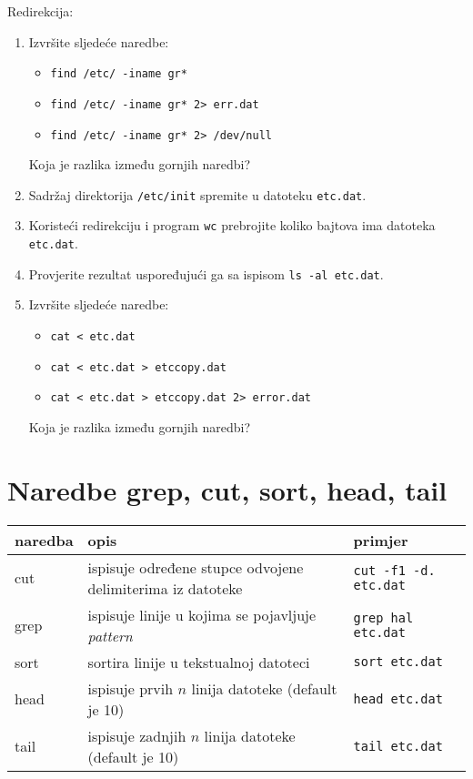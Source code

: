 \begin{zadatak} Redirekcija: 
\begin{enumerate}
\item 
Izvršite sljedeće naredbe:
\begin{itemize}
 \item \lstinline!find /etc/ -iname gr*!
\item \lstinline!find /etc/ -iname gr* 2> err.dat!
\item \lstinline!find /etc/ -iname gr* 2> /dev/null!
\end{itemize}             
Koja je razlika između gornjih naredbi?
\item Sadržaj direktorija \lstinline!/etc/init! spremite u datoteku \lstinline!etc.dat!.
\item Koristeći redirekciju i program \lstinline!wc! prebrojite koliko bajtova ima datoteka \lstinline!etc.dat!.
\item Provjerite rezultat uspoređujući ga sa ispisom \lstinline!ls -al etc.dat!.
\item Izvršite sljedeće naredbe:
\begin{itemize}
 \item \lstinline!cat < etc.dat!
\item \lstinline!cat < etc.dat > etccopy.dat!
\item \lstinline!cat < etc.dat > etccopy.dat 2> error.dat!
\end{itemize}
Koja je razlika između gornjih naredbi?
\end{enumerate}
\end{zadatak}

\section{Naredbe grep, cut, sort, head, tail}

\begin{tabularx}{\textwidth}{lXl} 
\hline 
naredba & opis & primjer\\
\hline
cut & ispisuje određene stupce odvojene delimiterima iz datoteke &\lstinline!cut -f1 -d. etc.dat!\\
grep & ispisuje linije u kojima se pojavljuje \textit{pattern} & \lstinline!grep hal etc.dat!\\
sort & sortira linije u tekstualnoj datoteci & \lstinline!sort etc.dat!\\
head & ispisuje prvih $n$ linija datoteke (default je 10) & \lstinline!head etc.dat!\\
tail & ispisuje zadnjih $n$ linija datoteke (default je 10) & \lstinline!tail etc.dat!
\\ \hline

\end{tabularx}

